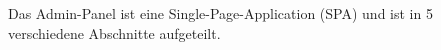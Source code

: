 Das Admin-Panel ist eine Single-Page-Application (SPA) und ist in 5 verschiedene Abschnitte aufgeteilt.